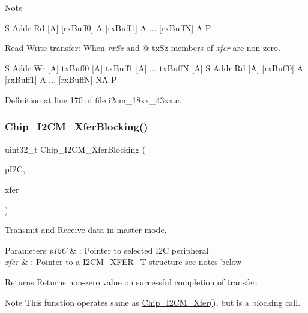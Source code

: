 \begin{DoxyNote}{Note}
\begin{DoxyItemize}
\begin{DoxyItemize}
S Addr Rd \mbox{[}A\mbox{]} \mbox{[}rx\+Buff0\mbox{]} A \mbox{[}rx\+Buff1\mbox{]} A ... \mbox{[}rx\+BuffN\mbox{]} A P
\end{DoxyItemize}
\item Read-\/\+Write transfer\+: When {\itshape rx\+Sz} and @ tx\+Sz members of {\itshape xfer} are non-\/zero. \begin{DoxyVerb}   S Addr Wr [A] txBuff0 [A] txBuff1 [A] ... txBuffN [A]
       S Addr Rd [A] [rxBuff0] A [rxBuff1] A ... [rxBuffN] NA P\end{DoxyVerb}
 
\end{DoxyItemize}
\end{DoxyNote}


Definition at line 170 of file i2cm\+\_\+18xx\+\_\+43xx.\+c.

\mbox{\label{group___i2_c_m__18_x_x__43_x_x_ga3d8a7e3de0a4e192e4f40790b164869a}} 
\subsubsection{\texorpdfstring{Chip\+\_\+\+I2\+C\+M\+\_\+\+Xfer\+Blocking()}{Chip\_I2CM\_XferBlocking()}}
{\footnotesize\ttfamily uint32\+\_\+t Chip\+\_\+\+I2\+C\+M\+\_\+\+Xfer\+Blocking (\begin{DoxyParamCaption}\item[{\hyperlink{struct_l_p_c___i2_c___t}{L\+P\+C\+\_\+\+I2\+C\+\_\+T} $\ast$}]{p\+I2C,  }\item[{\hyperlink{struct_i2_c_m___x_f_e_r___t}{I2\+C\+M\+\_\+\+X\+F\+E\+R\+\_\+T} $\ast$}]{xfer }\end{DoxyParamCaption})}



Transmit and Receive data in master mode. 


\begin{DoxyParams}{Parameters}
{\em p\+I2C} & \+: Pointer to selected I2C peripheral \\
\hline
{\em xfer} & \+: Pointer to a \hyperlink{struct_i2_c_m___x_f_e_r___t}{I2\+C\+M\+\_\+\+X\+F\+E\+R\+\_\+T} structure see notes below \\
\hline
\end{DoxyParams}
\begin{DoxyReturn}{Returns}
Returns non-\/zero value on successful completion of transfer. 
\end{DoxyReturn}
\begin{DoxyNote}{Note}
This function operates same as \hyperlink{group___i2_c_m__18_x_x__43_x_x_gad4b7e6761dd2450e45463a5acef9ee1a}{Chip\+\_\+\+I2\+C\+M\+\_\+\+Xfer()}, but is a blocking call. 
\end{DoxyNote}


